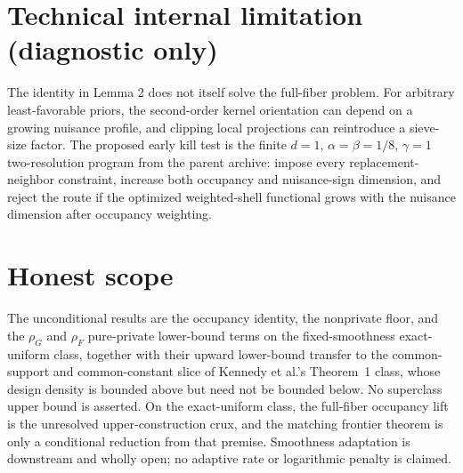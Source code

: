 \documentclass{article}
\begin{document}
\section*{Technical internal limitation (diagnostic only)}

The identity in Lemma 2 does not itself solve the full-fiber problem. For arbitrary least-favorable priors, the second-order kernel orientation can depend on a growing nuisance profile, and clipping local projections can reintroduce a sieve-size factor. The proposed early kill test is the finite \(d=1\), \(\alpha=\beta=1/8\), \(\gamma=1\) two-resolution program from the parent archive: impose every replacement-neighbor constraint, increase both occupancy and nuisance-sign dimension, and reject the route if the optimized weighted-shell functional grows with the nuisance dimension after occupancy weighting.

\section{Honest scope}

The unconditional results are the occupancy identity, the nonprivate floor, and the \(\rho_G\) and \(\rho_F\) pure-private lower-bound terms on the fixed-smoothness exact-uniform class, together with their upward lower-bound transfer to the common-support and common-constant slice of Kennedy et al.'s Theorem~1 class, whose design density is bounded above but need not be bounded below.  No superclass upper bound is asserted.  On the exact-uniform class, the full-fiber occupancy lift is the unresolved upper-construction crux, and the matching frontier theorem is only a conditional reduction from that premise.  Smoothness adaptation is downstream and wholly open; no adaptive rate or logarithmic penalty is claimed.
\end{document}
